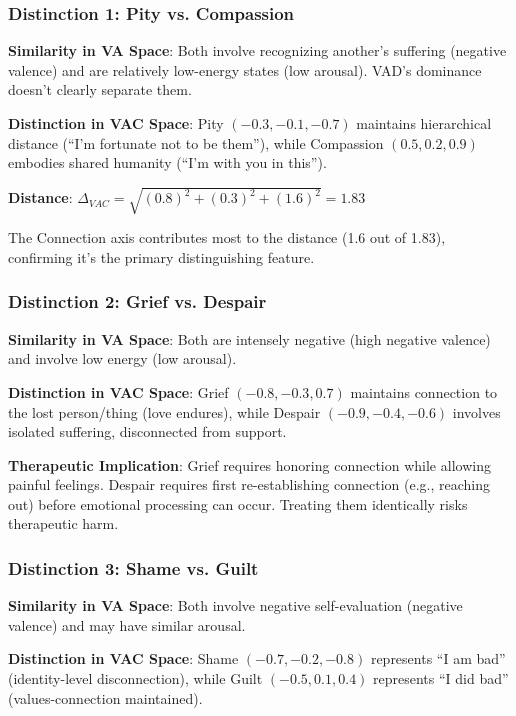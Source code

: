 \subsubsection{Distinction 1: Pity vs. Compassion}

\textbf{Similarity in VA Space}: Both involve recognizing another's suffering (negative valence) and are relatively low-energy states (low arousal). VAD's dominance doesn't clearly separate them.

\textbf{Distinction in VAC Space}: Pity $(-0.3, -0.1, -0.7)$ maintains hierarchical distance (``I'm fortunate not to be them''), while Compassion $(0.5, 0.2, 0.9)$ embodies shared humanity (``I'm with you in this'').

\textbf{Distance}: $\Delta_{VAC} = \sqrt{(0.8)^2 + (0.3)^2 + (1.6)^2} = 1.83$

The Connection axis contributes most to the distance (1.6 out of 1.83), confirming it's the primary distinguishing feature.

\subsubsection{Distinction 2: Grief vs. Despair}

\textbf{Similarity in VA Space}: Both are intensely negative (high negative valence) and involve low energy (low arousal).

\textbf{Distinction in VAC Space}: Grief $(-0.8, -0.3, 0.7)$ maintains connection to the lost person/thing (love endures), while Despair $(-0.9, -0.4, -0.6)$ involves isolated suffering, disconnected from support.

\textbf{Therapeutic Implication}: Grief requires honoring connection while allowing painful feelings. Despair requires first re-establishing connection (e.g., reaching out) before emotional processing can occur. Treating them identically risks therapeutic harm.

\subsubsection{Distinction 3: Shame vs. Guilt}

\textbf{Similarity in VA Space}: Both involve negative self-evaluation (negative valence) and may have similar arousal.

\textbf{Distinction in VAC Space}: Shame $(-0.7, -0.2, -0.8)$ represents ``I am bad'' (identity-level disconnection), while Guilt $(-0.5, 0.1, 0.4)$ represents ``I did bad'' (values-connection maintained).

